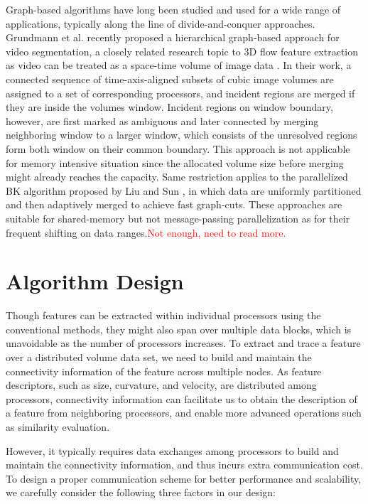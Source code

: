 \documentclass[10pt, conference, compsocconf]{IEEEtran}
\begin{document}
Graph-based algorithms have long been studied and used for a wide range of applications, typically along the line of divide-and-conquer approaches.
Grundmann et al. \cite{Grundmann2010} recently proposed a hierarchical graph-based approach for video segmentation, a closely related research topic to 3D flow feature extraction as video can be treated as a space-time volume of image data \cite{Klein2002}. In their work, a connected sequence of time-axis-aligned subsets of cubic image volumes are assigned to a set of corresponding processors, and incident regions are merged if they are inside the volumes window. Incident regions on window boundary, however, are first marked as ambiguous and later connected by merging neighboring window to a larger window, which consists of the unresolved regions form both window on their common boundary. This approach is not applicable for memory intensive situation since the allocated volume size before merging might already reaches the capacity. Same restriction applies to the parallelized BK algorithm \cite{Boykov2004} proposed by Liu and Sun \cite{Liu2010}, in which data are uniformly partitioned and then adaptively merged to achieve fast graph-cuts. These approaches are suitable for shared-memory but not message-passing parallelization as for their frequent shifting on data ranges.\textcolor{red}{Not enough, need to read more.}

\section{Algorithm Design}

Though features can be extracted within individual processors using the conventional methods, they might also span over multiple data blocks, which is unavoidable as the number of processors increases. To extract and trace a feature over a distributed volume data set, we need to build and maintain the connectivity information of the feature across multiple nodes. As feature descriptors, such as size, curvature, and velocity, are distributed among processors, connectivity information can facilitate us to obtain the description of a feature from neighboring processors, and enable more advanced operations such as similarity evaluation.

However, it typically requires data exchanges among processors to build and maintain the connectivity information, and thus incurs extra communication cost. To design a proper communication scheme for better performance and scalability, we carefully consider the following three factors in our design:
\end{document}
